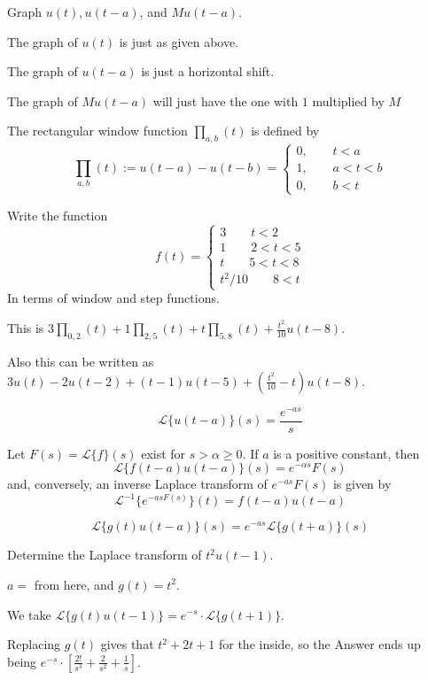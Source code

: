 \documentclass[../diffeq.tex]{subfiles}
\begin{document}
\pagebreak
\begin{example}
    Graph $u(t), u(t-a)$, and $Mu(t-a)$.
    
    The graph of $u(t)$ is just as given above.

    The graph of $u(t-a)$ is just a horizontal shift.

    The graph of $Mu(t-a)$ will just have the one with $1$ multiplied by $M$
\end{example}

\begin{definition}
    The rectangular window function $\prod_{a,b}(t)$ is defined by 
    \[ \prod_{a,b}(t) := u(t-a)-u(t-b) = \begin{cases}
        0, \qquad t<a \\
        1, \qquad a<t<b \\
        0, \qquad b<t 
    \end{cases}
    \]
\end{definition}

\begin{example}
    Write the function 
    \[ f(t) = \begin{cases}
        3 \qquad t<2 \\
        1 \qquad 2<t<5 \\
        t \qquad 5<t<8 \\
        t^2/10 \qquad 8<t 
    \end{cases}\]
    In terms of window and step functions.

    This is $3\prod_{0,2}(t)+1\prod_{2,5}(t)+t\prod_{5,8}(t)+\frac{t^2}{10}u(t-8)$.

    Also this can be written as $3u(t)-2u(t-2)+(t-1)u(t-5)+(\frac{t^2}{10}-t)u(t-8)$.
\end{example}

\[\mathcal{L}\{u(t-a)\}(s)=\frac{e^{-as}}{s} \]

\begin{theorem}
    Let $F(s)=\mathcal{L}\{f\}(s)$ exist for $s>\alpha\geq 0$. If $a$ is a positive constant, then 
    \[ \mathcal{L}\{f(t-a)u(t-a)\}(s)=e^{-\alpha s}F(s)\]
    and, conversely, an inverse Laplace transform of $e^{-as}F(s)$ is given by 
    \[ \mathcal{L}^{-1}\{e^{-asF(s)}\}(t)=f(t-a)u(t-a) \]
\end{theorem}

\[\mathcal{L}\{g(t)u(t-a)\}(s)=e^{-as}\mathcal{L}\{g(t+a)\}(s)\]

\pagebreak
\begin{example}
    Determine the Laplace transform of $t^2u(t-1)$.

    $a=$ from here, and $g(t)=t^2$.

    We take $\mathcal{L}\{g(t)u(t-1)\} = e^{-s}\cdot \mathcal{L}\{g(t+1)\}$.

    Replacing $g(t)$ gives that $t^2+2t+1$ for the inside, so the Answer ends up being $e^{-s}\cdot [\frac{2!}{s^3}+\frac{2}{s^2}+\frac{1}{s}]$.
\end{example}
\end{document}

